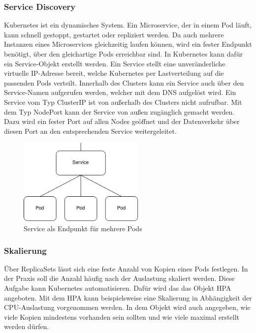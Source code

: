 \subsubsection{Service Discovery}
Kubernetes ist ein dynamisches System. Ein Microservice, der in einem Pod läuft, kann schnell gestoppt, gestartet oder repliziert werden. Da auch mehrere Instanzen eines Microservices gleichzeitig laufen können, wird ein fester Endpunkt benötigt, über den gleichartige Pods erreichbar sind. In Kubernetes kann dafür ein Service-Objekt erstellt werden. Ein Service stellt eine unveränderliche virtuelle IP-Adresse bereit, welche Kubernetes per Lastverteilung auf die passenden Pods verteilt. Innerhalb des Clusters kann ein Service auch über den Service-Namen aufgerufen werden, welcher mit dem \ac{DNS} aufgelöst wird. Ein Service vom Typ ClusterIP ist von außerhalb des Clusters nicht aufrufbar. Mit dem Typ NodePort kann der Service von außen zugänglich gemacht werden. Dazu wird ein fester Port auf allen Nodes geöffnet und der Datenverkehr über diesen Port an den entsprechenden Service weitergeleitet.

\begin{figure}[H] 
    \centering
    \includegraphics[width=0.55\textwidth]{figures/KubernetesService.png}
    \caption{Service als Endpunkt für mehrere Pods \parencite[vgl.][S. 67]{arundelCloud2019}}
\end{figure}

\subsubsection{Skalierung}

Über ReplicaSets lässt sich eine feste Anzahl von Kopien eines Pods festlegen. In der Praxis soll die Anzahl häufig nach der Auslastung skaliert werden. Diese Aufgabe kann Kubernetes automatisieren. Dafür wird das das Objekt \ac{HPA} angeboten. Mit dem \ac{HPA} kann beispielsweise eine Skalierung in Abhängigkeit der CPU-Auslastung vorgenommen werden. In dem Objekt wird auch angegeben, wie viele Kopien mindestens vorhanden sein sollten und wie viele maximal erstellt werden dürfen. 

